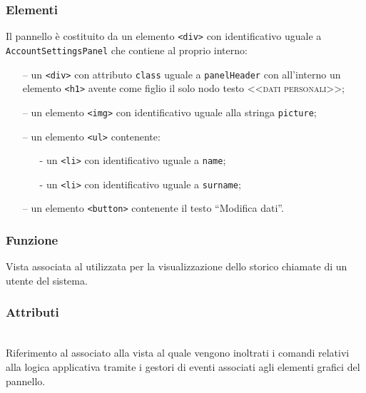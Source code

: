 \subsubsection*{Elementi}
Il pannello è costituito da un elemento \verb'<div>' con identificativo uguale a \verb'AccountSettingsPanel' che contiene al proprio interno:
\begin{itemize}
  \item[--] un \verb'<div>' con attributo \verb'class' uguale a \verb'panelHeader' con all'interno un elemento \verb'<h1>' avente come figlio il solo nodo testo \textsc{<<dati personali>>};
  \item[--] un elemento \verb'<img>' con identificativo uguale alla stringa \verb'picture';
  \item[--] un elemento \verb'<ul>' contenente:
  \begin{itemize}
    \item[-] un \verb'<li>' con identificativo uguale a \verb'name';
    \item[-] un \verb'<li>' con identificativo uguale a \verb'surname';
  \end{itemize}
  \item[--] un elemento \verb'<button>' contenente il testo ``Modifica dati''.
\end{itemize}




\subsubsection*{Funzione}
Vista associata al   utilizzata per la visualizzazione dello storico chiamate di un utente del sistema.

\subsubsection*{Attributi}
\begin{description}
  \item{}\\
  Riferimento al  associato alla vista al quale vengono inoltrati i comandi relativi alla logica applicativa tramite i gestori di eventi associati agli elementi grafici del pannello.
\end{description}

